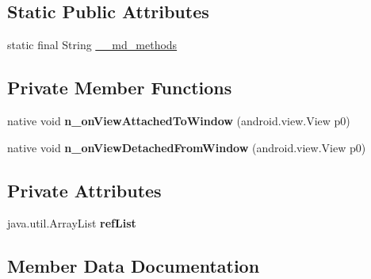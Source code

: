 \subsection*{Static Public Attributes}
\begin{DoxyCompactItemize}
\item 
static final String \hyperlink{classmd5b60ffeb829f638581ab2bb9b1a7f4f3f_1_1VisualElementTracker__AttachTracker_a16358e9d6e1593b6ee783eac6cc7ee81}{\+\_\+\+\_\+md\+\_\+methods}
\end{DoxyCompactItemize}
\subsection*{Private Member Functions}
\begin{DoxyCompactItemize}
\item 
\mbox{\label{classmd5b60ffeb829f638581ab2bb9b1a7f4f3f_1_1VisualElementTracker__AttachTracker_a41e798b3736e9db4d141ad9f726e09e0}} 
native void {\bfseries n\+\_\+on\+View\+Attached\+To\+Window} (android.\+view.\+View p0)
\item 
\mbox{\label{classmd5b60ffeb829f638581ab2bb9b1a7f4f3f_1_1VisualElementTracker__AttachTracker_ad123aa38e94e7b49e07d151618bf7749}} 
native void {\bfseries n\+\_\+on\+View\+Detached\+From\+Window} (android.\+view.\+View p0)
\end{DoxyCompactItemize}
\subsection*{Private Attributes}
\begin{DoxyCompactItemize}
\item 
\mbox{\label{classmd5b60ffeb829f638581ab2bb9b1a7f4f3f_1_1VisualElementTracker__AttachTracker_a54dbcf5c7b4ceea634f9e3f1995dccb1}} 
java.\+util.\+Array\+List {\bfseries ref\+List}
\end{DoxyCompactItemize}


\subsection{Member Data Documentation}
\mbox{\label{classmd5b60ffeb829f638581ab2bb9b1a7f4f3f_1_1VisualElementTracker__AttachTracker_a16358e9d6e1593b6ee783eac6cc7ee81}} 
